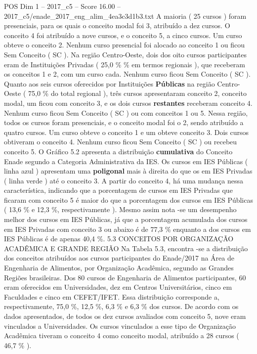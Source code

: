 \begin{textsample}{POS Dim 1 – 2017\_c5 – Score 16.00 – 2017\_c5/enade\_2017\_eng\_alim\_4ea3c3d1b3.txt}
A maioria ( 25 cursos ) foram presenciais, para os quais o conceito modal foi 3, atribuído a dez cursos.
O conceito 4 foi atribuído a nove cursos, e o conceito 5, a cinco cursos.
Um curso obteve o conceito 2.
Nenhum curso presencial foi alocado ao conceito 1 ou ficou Sem Conceito ( SC ).
Na região Centro-Oeste, dois dos oito cursos participantes eram de Instituições Privadas ( 25,0 \% \% em termos regionais ), que receberam os conceitos 1 e 2, com um curso cada.
Nenhum curso ficou Sem Conceito ( SC ).
Quanto aos seis cursos oferecidos por Instituições \textbf{Públicas} na região Centro-Oeste ( 75,0 \% do total regional ), três cursos apresentaram conceito 2, conceito modal, um ficou com conceito 3, e os dois cursos \textbf{restantes} receberam conceito 4.
Nenhum curso ficou Sem Conceito ( SC ) ou com conceitos 1 ou 5.
Nessa região, todos os cursos foram presenciais, e o conceito modal foi o 2, sendo atribuído a quatro cursos.
Um curso obteve o conceito 1 e um obteve conceito 3.
Dois cursos obtiveram o conceito 4.
Nenhum curso ficou Sem Conceito ( SC ) ou recebeu conceito 5.
O Gráfico 5.2 apresenta a distribuição \textbf{cumulativa} do Conceito Enade segundo a Categoria Administrativa da IES.
Os cursos em IES Públicas ( linha azul ) apresentam uma \textbf{poligonal} mais à direita do que os em IES Privadas ( linha verde ) até o conceito 3.
A partir do conceito 4, há uma mudança nessa característica, indicando que a porcentagem de cursos em IES Privadas que ficaram com conceito 5 é maior do que a porcentagem dos cursos em IES Públicas ( 13,6 \% e 12,3 \%, respectivamente ).
Mesmo assim nota -se um desempenho melhor dos cursos em IES Públicas, já que a porcentagem acumulada dos cursos em IES Privadas com conceito 3 ou abaixo é de 77,3 \% enquanto a dos cursos em IES Públicas é de apenas 40,4 \%. 5.3 CONCEITOS POR ORGANIZAÇÃO ACADÊMICA E GRANDE REGIÃO Na Tabela 5.3, encontra -se a distribuição dos conceitos atribuídos aos cursos participantes do Enade/2017 na Área de Engenharia de Alimentos, por Organização Acadêmica, segundo as Grandes Regiões brasileiras.
Dos 80 cursos de Engenharia de Alimentos participantes, 60 eram oferecidos em Universidades, dez em Centros Universitários, cinco em Faculdades e cinco em CEFET/IFET.
Essa distribuição corresponde a, respectivamente, 75,0 \%, 12,5 \%, 6,3 \% e 6,3 \% dos cursos.
De acordo com os dados apresentados, de todos os dez cursos avaliados com conceito 5, nove eram vinculados a Universidades.
Os cursos vinculados a esse tipo de Organização Acadêmica tiveram o conceito 4 como conceito modal, atribuído a 28 cursos ( 46,7 \% ).

\end{textsample}
